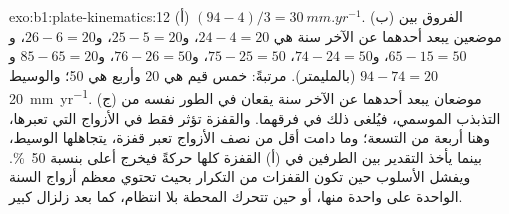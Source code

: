 \begin{solution}{exo:b1:plate-kinematics:12}
(أ) $(94 - 4)/3 = \qty{30}{mm.yr^{-1}}$. (ب) الفروق بين موضعين يبعد أحدهما عن الآخر سنة هي
$24 - 4 = 20$، و$25 - 5 = 20$، و$26 - 6 = 20$، و$65 - 15 = 50$، و$74 - 24 = 50$،
$75 - 25 = 50$، و$76 - 26 = 50$، و$85 - 65 = 20$ و$94 - 74 = 20$ (بالمليمتر). مرتبةً: خمس قيم هي 20 وأربع هي 50؛ والوسيط \qty{20}{mm.yr^{-1}}. (ج) موضعان يبعد أحدهما عن الآخر سنة يقعان في الطور نفسه من التذبذب الموسمي، فيُلغى ذلك في فرقهما. والقفزة تؤثر فقط في الأزواج التي تعبرها، وهنا أربعة من التسعة؛ وما دامت أقل من نصف الأزواج تعبر قفزة، يتجاهلها الوسيط، بينما يأخذ التقدير بين الطرفين في (أ) القفزة كلها حركةً فيخرج أعلى بنسبة \qty{50}{\percent}. ويفشل الأسلوب حين تكون القفزات من التكرار بحيث تحتوي معظم أزواج السنة الواحدة على واحدة منها، أو حين تتحرك المحطة بلا انتظام، كما بعد زلزال كبير.
\end{solution}

